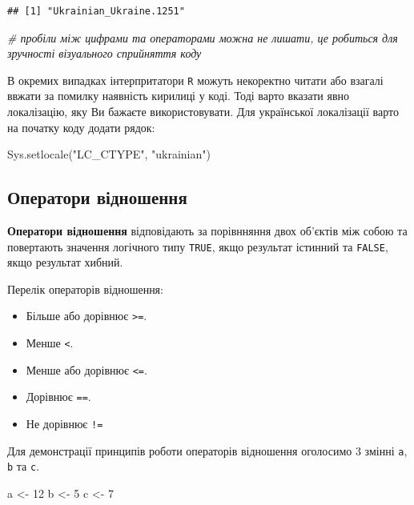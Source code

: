 \documentclass[
]{book}
\newenvironment{Shaded}{\begin{snugshade}}{\end{snugshade}}
\newcommand{\CommentTok}[1]{\textcolor[rgb]{0.56,0.35,0.01}{\textit{#1}}}
\newcommand{\DecValTok}[1]{\textcolor[rgb]{0.00,0.00,0.81}{#1}}
\newcommand{\FunctionTok}[1]{\textcolor[rgb]{0.00,0.00,0.00}{#1}}
\newcommand{\NormalTok}[1]{#1}
\newcommand{\OtherTok}[1]{\textcolor[rgb]{0.56,0.35,0.01}{#1}}
\newcommand{\StringTok}[1]{\textcolor[rgb]{0.31,0.60,0.02}{#1}}
\providecommand{\tightlist}{%
  \setlength{\itemsep}{0pt}\setlength{\parskip}{0pt}}
\begin{document}
\begin{verbatim}
## [1] "Ukrainian_Ukraine.1251"
\end{verbatim}

\begin{Shaded}
\begin{Highlighting}[]
\CommentTok{\# пробіли між цифрами та операторами можна не лишати, це робиться для зручності візуального сприйняття коду}
\end{Highlighting}
\end{Shaded}

В окремих випадках інтерпритатори \texttt{R} можуть некоректно читати або взагалі ввжати за помилку наявність кирилиці у коді. Тоді варто вказати явно локалізацію, яку Ви бажаєте використовувати. Для української локалізації варто на початку коду додати рядок:

\begin{Shaded}
\begin{Highlighting}[]
\FunctionTok{Sys.setlocale}\NormalTok{(}\StringTok{"LC\_CTYPE"}\NormalTok{, }\StringTok{"ukrainian"}\NormalTok{)}
\end{Highlighting}
\end{Shaded}

\hypertarget{chapter232}{%
\subsection{Оператори відношення}\label{chapter232}}

\textbf{Оператори відношення} відповідають за порівнняння двох об'єктів між собою та повертають значення логічного типу \texttt{TRUE}, якщо результат істинний та \texttt{FALSE}, якщо результат хибний.

Перелік операторів відношення:

\begin{itemize}
\tightlist
\item
  Більше або дорівнює \texttt{\textgreater{}=}.
\item
  Менше \texttt{\textless{}}.
\item
  Менше або дорівнює \texttt{\textless{}=}.
\item
  Дорівнює \texttt{==}.
\item
  Не дорівнює \texttt{!=}
\end{itemize}

Для демонстрації принципів роботи операторів відношення оголосимо 3 змінні \texttt{a}, \texttt{b} та \texttt{c}.

\begin{Shaded}
\begin{Highlighting}[]
\NormalTok{a }\OtherTok{\textless{}{-}} \DecValTok{12}
\NormalTok{b }\OtherTok{\textless{}{-}} \DecValTok{5}
\NormalTok{c }\OtherTok{\textless{}{-}} \DecValTok{7}
\end{Highlighting}
\end{Shaded}
\end{document}
